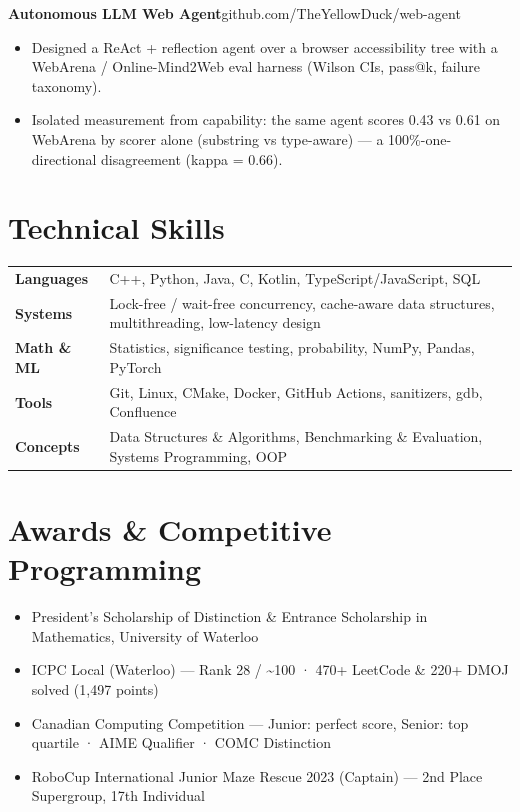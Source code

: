 \documentclass[letterpaper,11pt]{article}
\newcommand{\project}[3]{%
  \textbf{#1}\enspace{\small\textcolor{accent!55}{\textbar}\enspace #2}\hfill{\small #3}\par%
}
\newenvironment{bullets}
  {\begin{itemize}[leftmargin=1.5em,labelsep=0.5em,itemsep=1pt,topsep=1pt,parsep=0pt,partopsep=0pt]\small}
  {\end{itemize}\vspace{1pt}}
\begin{document}
\project{Autonomous LLM Web Agent}{Python, Playwright}{github.com/TheYellowDuck/web-agent}
\begin{bullets}
  \item Designed a ReAct + reflection agent over a browser accessibility tree with a WebArena / Online-Mind2Web eval harness (Wilson CIs, pass@k, failure taxonomy).
  \item Isolated measurement from capability: the same agent scores 0.43 vs 0.61 on WebArena by scorer alone (substring vs type-aware) --- a 100\%-one-directional disagreement (kappa = 0.66).
\end{bullets}

\section{Technical Skills}
\begin{tabularx}{\textwidth}{@{}l X@{}}
  \textbf{Languages} & C++, Python, Java, C, Kotlin, TypeScript/JavaScript, SQL\\
  \textbf{Systems} & Lock-free / wait-free concurrency, cache-aware data structures, multithreading, low-latency design\\
  \textbf{Math \& ML} & Statistics, significance testing, probability, NumPy, Pandas, PyTorch\\
  \textbf{Tools} & Git, Linux, CMake, Docker, GitHub Actions, sanitizers, gdb, Confluence\\
  \textbf{Concepts} & Data Structures \& Algorithms, Benchmarking \& Evaluation, Systems Programming, OOP\\
\end{tabularx}

\section{Awards \& Competitive Programming}
\begin{bullets}
  \item President's Scholarship of Distinction \& Entrance Scholarship in Mathematics, University of Waterloo
  \item ICPC Local (Waterloo) --- Rank 28 / \textasciitilde100 · 470+ LeetCode \& 220+ DMOJ solved (1{,}497 points)
  \item Canadian Computing Competition --- Junior: perfect score, Senior: top quartile · AIME Qualifier · COMC Distinction
  \item RoboCup International Junior Maze Rescue 2023 (Captain) --- 2nd Place Supergroup, 17th Individual
\end{bullets}
\end{document}
